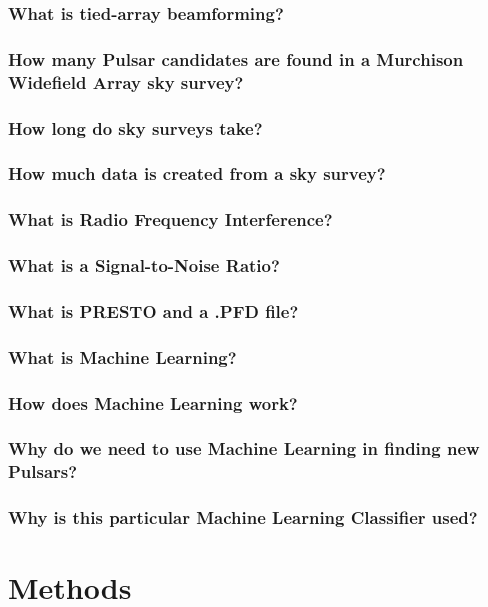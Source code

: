 \documentclass{article}
\begin{document}
\subsubsection{What is tied-array beamforming?}
\subsubsection{How many Pulsar candidates are found in a Murchison Widefield Array sky survey?}
\subsubsection{How long do sky surveys take?}
\subsubsection{How much data is created from a sky survey?}
\subsubsection{What is Radio Frequency Interference?}
\subsubsection{What is a Signal-to-Noise Ratio?}
\subsubsection{What is PRESTO and a .PFD file?}
\subsubsection{What is Machine Learning?}
\subsubsection{How does Machine Learning work?}
\subsubsection{Why do we need to use Machine Learning in finding new Pulsars?}
\subsubsection{Why is this particular Machine Learning Classifier used?}


\pagebreak
\section{Methods}
\end{document}
